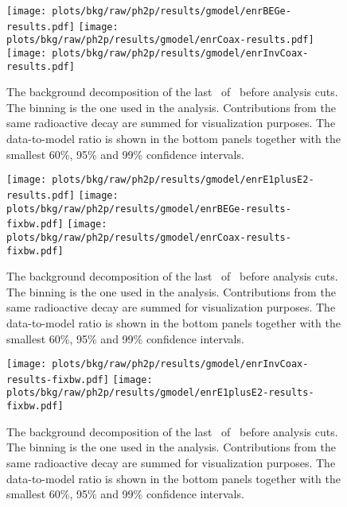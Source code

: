 \begin{figure}
  \centering
  \texttt{[image: plots/bkg/raw/ph2p/results/gmodel/enrBEGe-results.pdf]}
  \texttt{[image: plots/bkg/raw/ph2p/results/gmodel/enrCoax-results.pdf]}
  \texttt{[image: plots/bkg/raw/ph2p/results/gmodel/enrInvCoax-results.pdf]}
  \caption{%
    The background decomposition of the last \gexpophasetwopbkg\ of \gerdatwo\ before
    analysis cuts. The binning is the one used in the analysis. Contributions from
    the same radioactive decay are summed for visualization purposes. The data-to-model
    ratio is shown in the bottom panels together with the smallest 60\%, 95\% and 99\%
    confidence intervals.
  }\label{fig:bkg:raw:ph2p:results-1}
\end{figure}

\begin{figure}
  \centering
  \texttt{[image: plots/bkg/raw/ph2p/results/gmodel/enrE1plusE2-results.pdf]}
  \texttt{[image: plots/bkg/raw/ph2p/results/gmodel/enrBEGe-results-fixbw.pdf]}
  \texttt{[image: plots/bkg/raw/ph2p/results/gmodel/enrCoax-results-fixbw.pdf]}
  \caption{%
    The background decomposition of the last \gexpophasetwopbkg\ of \gerdatwo\ before
    analysis cuts. The binning is the one used in the analysis. Contributions from
    the same radioactive decay are summed for visualization purposes. The data-to-model
    ratio is shown in the bottom panels together with the smallest 60\%, 95\% and 99\%
    confidence intervals.
  }\label{fig:bkg:raw:ph2p:results-2}
\end{figure}

\begin{figure}
  \centering
  \texttt{[image: plots/bkg/raw/ph2p/results/gmodel/enrInvCoax-results-fixbw.pdf]}
  \texttt{[image: plots/bkg/raw/ph2p/results/gmodel/enrE1plusE2-results-fixbw.pdf]}
  \caption{%
    The background decomposition of the last \gexpophasetwopbkg\ of \gerdatwo\ before
    analysis cuts. The binning is the one used in the analysis. Contributions from
    the same radioactive decay are summed for visualization purposes. The data-to-model
    ratio is shown in the bottom panels together with the smallest 60\%, 95\% and 99\%
    confidence intervals.
  }\label{fig:bkg:raw:ph2p:results-3}
\end{figure}


